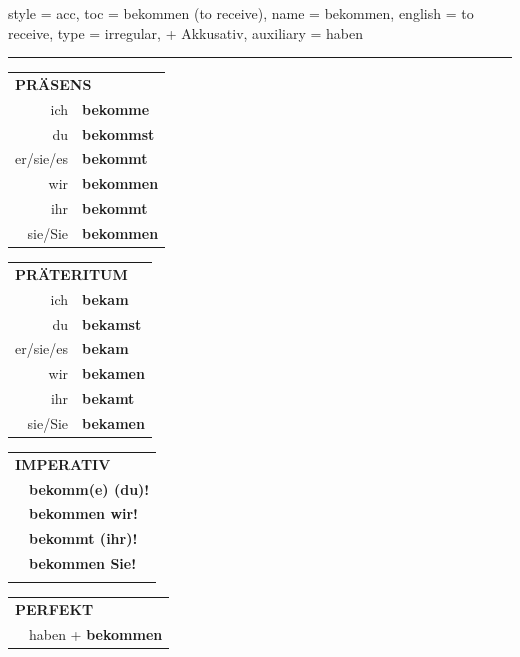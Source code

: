 \begin{verbentry}{
  style = {acc},
  toc = {bekommen (to receive)},
  name = {bekommen},
  english = {to receive},
  type = {irregular, + Akkusativ},
  auxiliary = {haben}
}
 
    
     \vspace{5pt}

    \hrule
    
    \vspace{5pt}

  \begin{tabular}{rl}
     \multicolumn{2}{l}{\textbf{PRÄSENS} }\\
    ich & \textbf{bekomme}\\
    du & \textbf{bekommst}\\
    er/sie/es & \textbf{bekommt}\\
    wir & \textbf{bekommen}\\
    ihr & \textbf{bekommt}\\
    sie/Sie & \textbf{bekommen}\\
  \end{tabular}
  \hfill
     \begin{tabular}{rl}
    \multicolumn{2}{l}{\textbf{PRÄTERITUM} }\\
    ich & \textbf{bekam}\\
    du & \textbf{bekamst}\\
    er/sie/es & \textbf{bekam}\\
    wir & \textbf{bekamen}\\
    ihr & \textbf{bekamt}\\
    sie/Sie & \textbf{bekamen}\\
  \end{tabular}
  \hfill
  \begin{tabular}{rl}
     \multicolumn{2}{l}{\textbf{IMPERATIV} }\\
   & \textbf{bekomm(e) (du)!}\\
   & \textbf{bekommen wir!}\\
   & \textbf{bekommt (ihr)!}\\
   & \textbf{bekommen Sie!}\\
   & \vspace{10pt}
  \end{tabular}

    \vspace{10pt}

 \begin{tabular}{rl}
     \multicolumn{2}{l}{\textbf{PERFEKT}}\\
  &  haben + \textbf{bekommen}\\
  \end{tabular}
\hfill
   \begin{tabular}{rl}
   

\end{tabular}
\end{verbentry}
